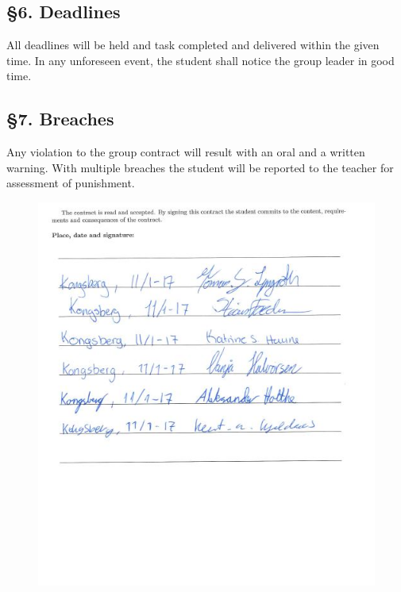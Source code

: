 \subsection*{§6. Deadlines}
All deadlines will be held and task completed and delivered within the given time. In any unforeseen event, the student shall notice the group leader in good time.

\subsection*{§7. Breaches}
Any violation to the group contract will result with an oral and a written warning. With multiple breaches the student will be reported to the teacher for assessment of punishment.



\begin{figure}
\includegraphics[scale = 1.6]{VAPIQ-PICTURES/gruppekontrakt.JPG}
\end{figure}






